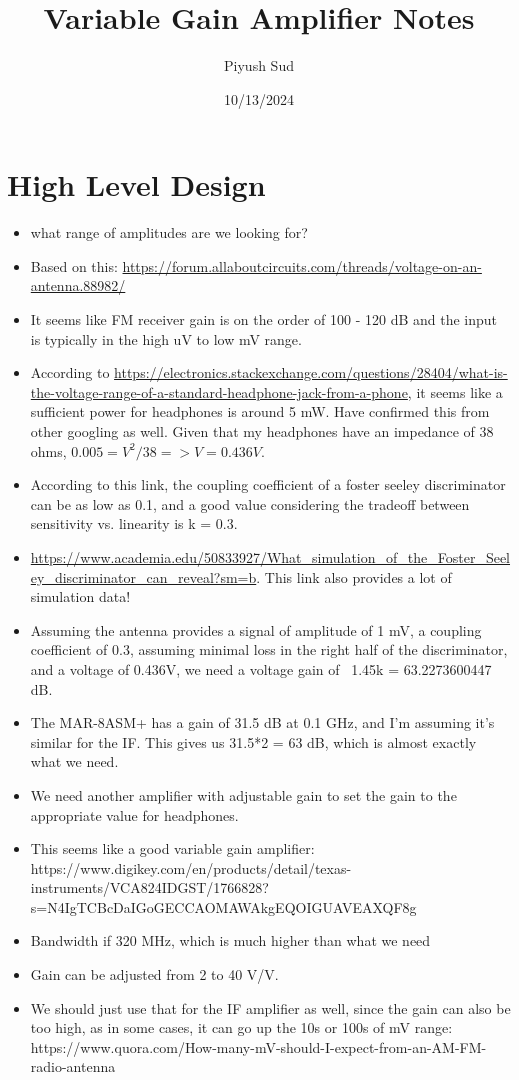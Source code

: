 \documentclass[12pt, letterpaper]{article}
\title{Variable Gain Amplifier Notes}
\author{Piyush Sud}
\date{10/13/2024}
\begin{document}
\maketitle

\pagebreak

\section{High Level Design}

\begin{itemize}
    \item what range of amplitudes are we looking for?
    \item Based on this: \url{https://forum.allaboutcircuits.com/threads/voltage-on-an-antenna.88982/}
    \item It seems like FM receiver gain is on the order of 100 - 120 dB and the input is typically in the high uV to low mV range.
    \item According to \url{https://electronics.stackexchange.com/questions/28404/what-is-the-voltage-range-of-a-standard-headphone-jack-from-a-phone}, it seems like a sufficient power for headphones is around 5 mW. Have confirmed this from other googling as well. Given that my headphones have an impedance of 38 ohms, \(0.005 = V^2/38 => V = 0.436V\). 
    \item According to this link, the coupling coefficient of a foster seeley discriminator can be as low as 0.1, and a good value considering the tradeoff between sensitivity vs. linearity is k = 0.3. 
    \item \url{https://www.academia.edu/50833927/What_simulation_of_the_Foster_Seeley_discriminator_can_reveal?sm=b}. This link also provides a lot of simulation data!
    \item Assuming the antenna provides a signal of amplitude of 1 mV, a coupling coefficient of 0.3, assuming minimal loss in the right half of the discriminator, and a voltage of 0.436V, we need a voltage gain of ~1.45k = 63.2273600447 dB. 
    \item The MAR-8ASM+ has a gain of 31.5 dB at 0.1 GHz, and I'm assuming it's similar for the IF. This gives us 31.5*2 = 63 dB, which is almost exactly what we need. 
    \item We need another amplifier with adjustable gain to set the gain to the appropriate value for headphones.
    \item This seems like a good variable gain amplifier: https://www.digikey.com/en/products/detail/texas-instruments/VCA824IDGST/1766828?s=N4IgTCBcDaIGoGECCAOMAWAkgEQOIGUAVEAXQF8g
    \item Bandwidth if 320 MHz, which is much higher than what we need
    \item Gain can be adjusted from 2 to 40 V/V.
    \item We should just use that for the IF amplifier as well, since the gain can also be too high, as in some cases, it can go up the 10s or 100s of mV range: https://www.quora.com/How-many-mV-should-I-expect-from-an-AM-FM-radio-antenna
\end{itemize}
\end{document}
